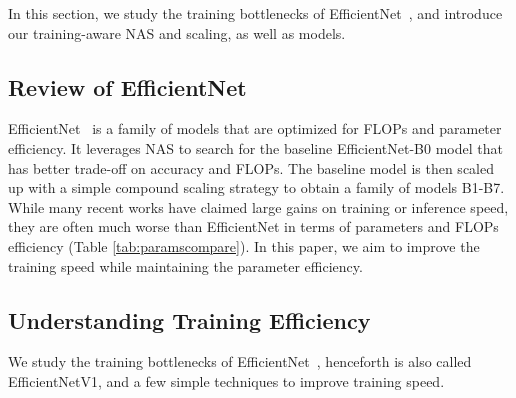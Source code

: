 \documentclass{article}
\begin{document}
In this section, we study the training bottlenecks of EfficientNet~\cite{efficientnet19}, and introduce our training-aware NAS and scaling, as well as {\xnet} models.

\subsection{Review of EfficientNet}
EfficientNet~\cite{efficientnet19} is a family of models that are optimized for FLOPs and parameter efficiency. It leverages NAS to search for the baseline EfficientNet-B0 model that has better trade-off on accuracy and FLOPs. The baseline model is then scaled up with a simple compound scaling strategy to obtain a family of models B1-B7.
While many recent works have claimed large gains on training or inference speed, they are often much worse than EfficientNet in terms of parameters and FLOPs efficiency (Table \ref{tab:paramscompare}). 
In this paper, we aim to improve the training speed while  maintaining the parameter efficiency.

\begin{table}[h]
    \vskip -0.15in
    \centering
    \caption{EfficientNets have good parameter and FLOPs efficiency.}
    \vskip -0.1in
\label{tab:paramscompare}
\end{table} 

\subsection{Understanding Training Efficiency}

We study the training bottlenecks of EfficientNet~\cite{efficientnet19}, henceforth is also called EfficientNetV1, and a few simple techniques to improve training speed.
\end{document}
